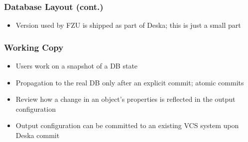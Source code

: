 \documentclass{beamer}
\begin{document}
\begin{frame}[fragile]
\frametitle{Database Layout (cont.)}
\begin{itemize}
    \item Version used by FZU is shipped as part of Deska; this is just a small part
\end{itemize}
\end{frame}

\begin{frame}[fragile]
\frametitle{Working Copy}
\begin{itemize}
    \item Users work on a snapshot of a DB state
    \item Propagation to the real DB only after an explicit commit; atomic commits
    \item Review how a change in an object's properties is reflected in the
        output configuration
    \item Output configuration can be committed to an existing VCS system upon Deska commit
\end{itemize}
\end{frame}
\end{document}
